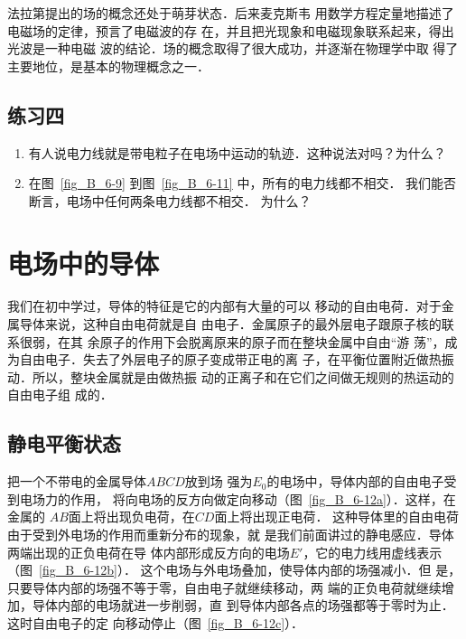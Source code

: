 法拉第提出的场的概念还处于萌芽状态．后来麦克斯韦
用数学方程定量地描述了电磁场的定律，预言了电磁波的存
在，并且把光现象和电磁现象联系起来，得出光波是一种电磁
波的结论．场的概念取得了很大成功，并逐渐在物理学中取
得了主要地位，是基本的物理概念之一．

\subsection*{练习四}

\begin{enumerate}
    \item 有人说电力线就是带电粒子在电场中运动的轨迹．这种说法对吗？为什么？
    \item 在图~\ref{fig_B_6-9} 到图~\ref{fig_B_6-11} 中，所有的电力线都不相交．
    我们能否断言，电场中任何两条电力线都不相交．
    为什么？
\end{enumerate}

\section{电场中的导体}
我们在初中学过，导体的特征是它的内部有大量的可以
移动的自由电荷．对于金属导体来说，这种自由电荷就是自
由电子．金属原子的最外层电子跟原子核的联系很弱，在其
余原子的作用下会脱离原来的原子而在整块金属中自由“游
荡”，成为自由电子．失去了外层电子的原子变成带正电的离
子，在平衡位置附近做热振动．所以，整块金属就是由做热振
动的正离子和在它们之间做无规则的热运动的自由电子组
成的．

\subsection{静电平衡状态} 


把一个不带电的金属导体$ABCD$放到场
强为$E_0$的电场中，导体内部的自由电子受到电场力的作用，
将向电场的反方向做定向移动（图~\ref{fig_B_6-12a}）．这样，在金属的
$AB$面上将出现负电荷，在$CD$面上将出现正电荷．
这种导体里的自由电荷由于受到外电场的作用而重新分布的现象，就
是我们前面讲过的静电感应．导体两端出现的正负电荷在导
体内部形成反方向的电场$E'$，它的电力线用虚线表示（图~\ref{fig_B_6-12b}）．
这个电场与外电场叠加，使导体内部的场强减小．但
是，只要导体内部的场强不等于零，自由电子就继续移动，两
端的正负电荷就继续增加，导体内部的电场就进一步削弱，直
到导体内部各点的场强都等于零时为止．这时自由电子的定
向移动停止（图~\ref{fig_B_6-12c}）．

